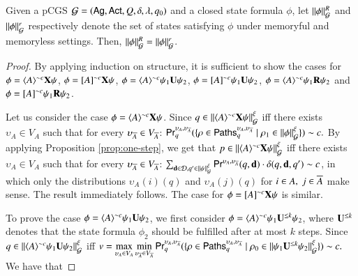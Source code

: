 \begin{proposition}\label{prop-mc-pamc-memless}
Given a pCGS $\mathcal{G}=(\textsf{Ag},\textsf{Act}, Q, \delta,\lambda,q_0)$ and a closed \pamcc state formula $\phi$,
let $\|{\phi}\|_{\mathcal{G}}^R$ and $\|{\phi}\|_{\mathcal{G}}^r$ respectively denote the set of states
satisfying $\phi$ under memoryful and memoryless settings. Then,
$\|{\phi}\|_{\mathcal{G}}^R=\|{\phi}\|_{\mathcal{G}}^r$.
\end{proposition}
\begin{proof}
By applying induction on structure, it is sufficient to show the cases for $\phi=\langle{A}\rangle^{\sim c}{\bf X}\psi$, $\phi=[{A}]^{\sim c}{\bf X}\psi$,
$\phi=\langle{A}\rangle^{\sim c}\psi_1{\bf U}\psi_2$, $\phi=[{A}]^{\sim c}\psi_1{\bf U}\psi_2$, $\phi=\langle{A}\rangle^{\sim c}\psi_1{\bf R}\psi_2$ and $\phi=[{A}]^{\sim c}\psi_1{\bf R}\psi_2$.

Let us consider the case $\phi=\langle{A}\rangle^{\sim c}{\bf X}\psi$.
Since $q\in \|{\langle{A}\rangle^{\sim c}{\bf X}\psi}\|_{\mathcal{G}}^\xi$ iff there exists $\upsilon_A\in V_A$ such that for every $\upsilon_{\overline{A}}\in V_{\overline{A}}$: $\textsf{Pr}_q^{\upsilon_A,\upsilon_{\overline{A}}}(\{\rho\in {\sf Paths}_q^{\upsilon_A,\upsilon_{\overline{A}}}\mid \rho_1\in\|{\phi}\|_{\mathcal{G}}^\xi\})\sim c.$
By applying Proposition \ref{prop:one-step},
we get that $p\in \|{\langle{A}\rangle^{\sim c}{\bf X}\psi}\|_{\mathcal{G}}^\xi$ iff there exists $\upsilon_A\in V_A$ such that for every $\upsilon_{\overline{A}}\in V_{\overline{A}}$: $\sum_{{\bf d} \in\mathcal{D} , q'\in \|{\psi}\|_{\mathcal{G}}^\xi} \textsf{Pr}^{\upsilon_A,\upsilon_{\overline{A}}}(q,{\bf d})\cdot \delta(q,{\bf d},q')\sim c$, in which
only the distributions $\upsilon_A(i)(q)$  and $\upsilon_A(j)(q)$ for $i\in A, \ j\in\overline{A}$ make sense. The result immediately follows.
The case for $\phi=[{A}]^{\sim c}{\bf X}\psi$ is similar.

To prove the case $\phi=\langle{A}\rangle^{\sim c}\psi_1{\bf U}\psi_2$, we first consider $\phi=\langle{A}\rangle^{\sim c}\psi_1{\bf U}^{\leq k}\psi_2$, where
${\bf U}^{\leq k}$ denotes that the state formula $\phi_2$ should be fulfilled after at most $k$ steps.
Since $q\in \|{\langle{A}\rangle^{\sim c}\psi_1{\bf U}\psi_2}\|_{\mathcal{G}}^\xi$ iff  $v=\max\limits_{\upsilon_A\in V_A} \min\limits_{\upsilon_{\overline{A}}\in V_{\overline{A}}} \textsf{Pr}_q^{\upsilon_A,\upsilon_{\overline{A}}}(\{\rho\in {\sf Paths}_q^{\upsilon_A,\upsilon_{\overline{A}}}\mid \rho_0\in\|{\psi_1{\bf U}^{\leq k}\psi_2}\|_{\mathcal{G}}^\xi\})\sim c.$
We have that


\end{proof}
